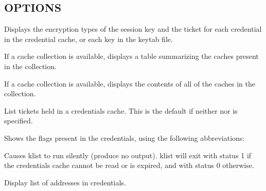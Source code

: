 \documentclass[letterpaper,10pt,english]{sphinxmanual}
\begin{document}
\subsection{OPTIONS}
\label{\detokenize{user/user_commands/klist:options}}\begin{description}
\sphinxAtStartPar
Displays the encryption types of the session key and the ticket
for each credential in the credential cache, or each key in the
keytab file.

\sphinxAtStartPar
If a cache collection is available, displays a table summarizing
the caches present in the collection.

\sphinxAtStartPar
If a cache collection is available, displays the contents of all
of the caches in the collection.

\sphinxAtStartPar
List tickets held in a credentials cache. This is the default if
neither  nor  is specified.

\sphinxAtStartPar
Shows the flags present in the credentials, using the following
abbreviations:

\begin{sphinxVerbatim}[commandchars=\\\{\}]
    
    
    
    
    
    
    
    
    
     
    
      
      
    
\end{sphinxVerbatim}

\sphinxAtStartPar
Causes klist to run silently (produce no output).  klist will exit
with status 1 if the credentials cache cannot be read or is
expired, and with status 0 otherwise.

\sphinxAtStartPar
Display list of addresses in credentials.


\end{description}
\end{document}

